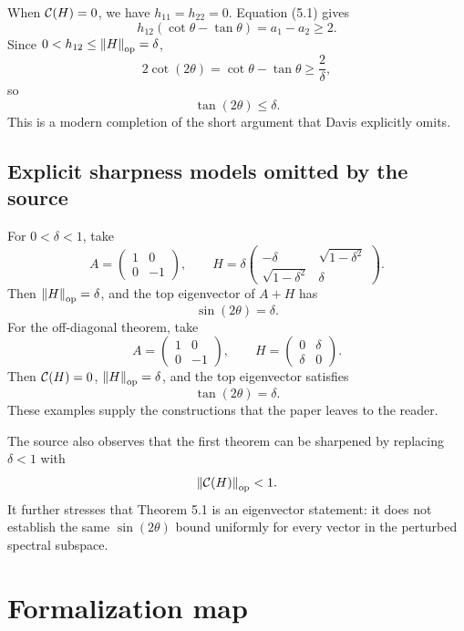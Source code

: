 When $\mathcal{C}(H)=0$, we have $h_{11}=h_{22}=0$. Equation (5.1) gives
\[
  h_{12}(\cot\theta-\tan\theta)=a_1-a_2\ge2.
\]
Since $0<h_{12}\le\left\lVert H\right\rVert_{\mathrm{op}}=\delta$,
\[
  2\cot(2\theta)=\cot\theta-\tan\theta\ge\frac{2}{\delta},
\]
so
\[
  \tan(2\theta)\le\delta.
\]
This is a modern completion of the short argument that Davis explicitly omits.

\subsection{Explicit sharpness models omitted by the source}

For $0<\delta<1$, take
\[
  A=\begin{pmatrix}1&0\\0&-1\end{pmatrix},
  \qquad
  H=\delta
  \begin{pmatrix}
    -\delta&\sqrt{1-\delta^2}\\
    \sqrt{1-\delta^2}&\delta
  \end{pmatrix}.
\]
Then $\left\lVert H\right\rVert_{\mathrm{op}}=\delta$, and the top eigenvector of $A+H$ has
\[
  \sin(2\theta)=\delta.
\]
For the off-diagonal theorem, take
\[
  A=\begin{pmatrix}1&0\\0&-1\end{pmatrix},
  \qquad
  H=\begin{pmatrix}0&\delta\\\delta&0\end{pmatrix}.
\]
Then $\mathcal{C}(H)=0$, $\left\lVert H\right\rVert_{\mathrm{op}}=\delta$, and the top eigenvector satisfies
\[
  \tan(2\theta)=\delta.
\]
These examples supply the constructions that the paper leaves to the reader.

The source also observes that the first theorem can be sharpened by replacing $\delta<1$ with
\[
  \left\lVert \mathcal{C}(H)\right\rVert_{\mathrm{op}}<1.
\]
It further stresses that Theorem 5.1 is an eigenvector statement: it does not establish the same $\sin(2\theta)$ bound uniformly for every vector in the perturbed spectral subspace.

\section{Formalization map}

